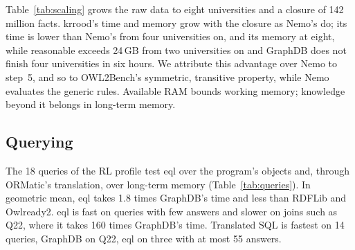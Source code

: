 \documentclass[sigconf,anonymous]{aamas}
\begin{document}
Table~\ref{tab:scaling} grows the raw data to eight universities and a closure of 142 million facts. \ac{krrood}'s time and memory grow with the closure as Nemo's do; its time is lower than Nemo's from four universities on, and its memory at eight, while reasonable exceeds 24\,GB from two universities on and GraphDB does not finish four universities in six hours. We attribute this advantage over Nemo to step~5, and so to OWL2Bench's symmetric, transitive property, while Nemo evaluates the generic rules. Available RAM bounds working memory; knowledge beyond it belongs in long-term memory.

\begin{table}[t]
  \centering
  \caption{Loading and reasoning from the raw data of 1 to 8 universities (``Raw'': explicit statements): time (s; mean of 3 runs; GraphDB: one run on one core, from two universities on in a 2-CPU container) and memory increase. ``Out of mem.'': stopped at 24\,GB; ``--'': not run; ``$>$'': stopped after 6\,h.}
  \label{tab:scaling}
  \footnotesize
  \setlength{\tabcolsep}{2.5pt}
  
\end{table}

\subsection{Querying}
\label{ssec:querying}

The 18 queries of the RL profile test \ac{eql} over the program's objects and, through ORMatic's translation, over long-term memory (Table~\ref{tab:queries}). In geometric mean, \ac{eql} takes 1.8 times GraphDB's time and less than RDFLib and Owlready2. \ac{eql} is fast on queries with few answers and slower on joins such as Q22, where it takes 160 times GraphDB's time. Translated SQL is fastest on 14 queries, GraphDB on Q22, \ac{eql} on three with at most 55 answers.

\begin{table}[t]
  \centering
  \caption{OWL2Bench query times in ms (median of 10 runs without the first): geometric mean over the 18 queries (lowest in bold), queries on which a system is fastest, Q20 (1.3 million answers), Q22 (Listing~\ref{lst:q22}), and queries answered as by GraphDB. $^{\dagger}$Separate run, over the queried classes and properties only.}
  \label{tab:queries}
  \footnotesize
  \setlength{\tabcolsep}{4pt}
  
\end{table}
\end{document}

